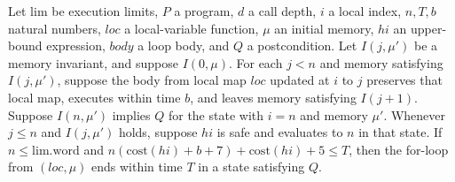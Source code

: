 \begin{theorem}
\label{Light.Ends.forMem}
\leanok
{}
Let $\mathrm{lim}$ be execution limits, $P$ a program, $d$ a call depth, $i$ a local index,
$n,T,b$ natural numbers, $loc$ a local-variable function, $\mu$ an initial memory, $hi$
an upper-bound expression, $body$ a loop body, and $Q$ a postcondition. Let $I(j,\mu\prime)$
be a memory invariant, and suppose $I(0,\mu)$. For each $j<n$ and memory satisfying
$I(j,\mu\prime)$, suppose the body from local map $loc$ updated at $i$ to $j$ preserves
that local map, executes within time $b$, and leaves memory satisfying $I(j+1)$. Suppose
$I(n,\mu\prime)$ implies $Q$ for the state with $i=n$ and memory $\mu\prime$. Whenever
$j\le n$ and $I(j,\mu\prime)$ holds, suppose $hi$ is safe and evaluates to $n$ in
that state. If $n\le\mathrm{lim.word}$ and
$n(\mathrm{cost}(hi)+b+7)+\mathrm{cost}(hi)+5\le T$, then the for-loop from $(loc,\mu)$
ends within time $T$ in a state satisfying $Q$.
\end{theorem}
